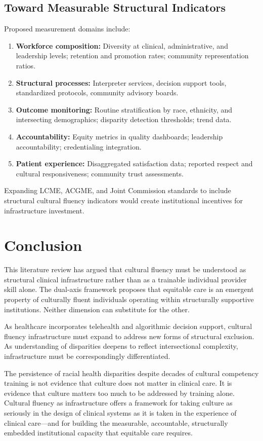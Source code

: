 \documentclass[12pt, a4paper]{article}
\begin{document}
\subsection{Toward Measurable Structural Indicators}

Proposed measurement domains include:
\begin{enumerate}
    \item \textbf{Workforce composition:} Diversity at clinical, administrative, and leadership levels; retention and promotion rates; community representation ratios.
    \item \textbf{Structural processes:} Interpreter services, decision support tools, standardized protocols, community advisory boards.
    \item \textbf{Outcome monitoring:} Routine stratification by race, ethnicity, and intersecting demographics; disparity detection thresholds; trend data.
    \item \textbf{Accountability:} Equity metrics in quality dashboards; leadership accountability; credentialing integration.
    \item \textbf{Patient experience:} Disaggregated satisfaction data; reported respect and cultural responsiveness; community trust assessments.
\end{enumerate}

Expanding LCME, ACGME, and Joint Commission standards to include structural cultural fluency indicators would create institutional incentives for infrastructure investment.

\section{Conclusion}

This literature review has argued that cultural fluency must be understood as structural clinical infrastructure rather than as a trainable individual provider skill alone. The dual-axis framework proposes that equitable care is an emergent property of culturally fluent individuals operating within structurally supportive institutions. Neither dimension can substitute for the other.

As healthcare incorporates telehealth and algorithmic decision support, cultural fluency infrastructure must expand to address new forms of structural exclusion. As understanding of disparities deepens to reflect intersectional complexity, infrastructure must be correspondingly differentiated.

The persistence of racial health disparities despite decades of cultural competency training is not evidence that culture does not matter in clinical care. It is evidence that culture matters too much to be addressed by training alone. Cultural fluency as infrastructure offers a framework for taking culture as seriously in the design of clinical systems as it is taken in the experience of clinical care---and for building the measurable, accountable, structurally embedded institutional capacity that equitable care requires.



\end{document}
